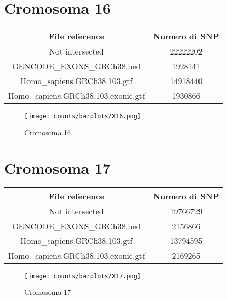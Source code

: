 \section*{Cromosoma 16}
  \begin{table}[H]\centering
	\begin{tabular}{|c|c|}
	  \hline
	  File reference & Numero di SNP \\
		\hline
		Not intersected & 22222202 \\
	  \hline
	  GENCODE\_EXONS\_GRCh38.bed & 1928141 \\
	  \hline
	  Homo\_sapiens.GRCh38.103.gtf & 14918440 \\
	  \hline
	  Homo\_sapiens.GRCh38.103.exonic.gtf & 1930866 \\
	  \hline
	\end{tabular}
  \end{table}
  \begin{figure}[H]
	\texttt{[image: counts/barplots/X16.png]}
	\caption{Cromosoma 16}
	\label{fig:chr16}
  \end{figure}

\section*{Cromosoma 17}
  \begin{table}[H]\centering
	\begin{tabular}{|c|c|}
	  \hline
	  File reference & Numero di SNP \\
		\hline
		Not intersected & 19766729 \\
	  \hline
	  GENCODE\_EXONS\_GRCh38.bed & 2156866 \\
	  \hline
	  Homo\_sapiens.GRCh38.103.gtf & 13794595 \\
	  \hline
	  Homo\_sapiens.GRCh38.103.exonic.gtf & 2169265 \\
	  \hline
	\end{tabular}
  \end{table}
  \begin{figure}[H]
	\texttt{[image: counts/barplots/X17.png]}
	\caption{Cromosoma 17}
	\label{fig:chr17}
  \end{figure}


